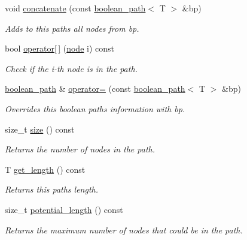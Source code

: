 \begin{DoxyCompactItemize}
void \hyperlink{classlgraph_1_1utils_1_1boolean__path_a005364eb88d63910a6e3965548d49197}{concatenate} (const \hyperlink{classlgraph_1_1utils_1_1boolean__path}{boolean\+\_\+path}$<$ T $>$ \&bp)
\begin{DoxyCompactList}\small\item\em Adds to this paths all nodes from bp. \end{DoxyCompactList}\item 
bool \hyperlink{classlgraph_1_1utils_1_1boolean__path_a9f0255a332cef8af3193fd683839d870}{operator\mbox{[}$\,$\mbox{]}} (\hyperlink{namespacelgraph_1_1utils_ab9c6b34241f0b68372c55f34c460e863}{node} i) const 
\begin{DoxyCompactList}\small\item\em Check if the i-\/th node is in the path. \end{DoxyCompactList}\item 
\hyperlink{classlgraph_1_1utils_1_1boolean__path}{boolean\+\_\+path} \& \hyperlink{classlgraph_1_1utils_1_1boolean__path_aedf4e03dbf45c2f66c79d01de5977ede}{operator=} (const \hyperlink{classlgraph_1_1utils_1_1boolean__path}{boolean\+\_\+path}$<$ T $>$ \&bp)
\begin{DoxyCompactList}\small\item\em Overrides this boolean path\textquotesingle{}s information with {\itshape bp}. \end{DoxyCompactList}\item 
size\+\_\+t \hyperlink{classlgraph_1_1utils_1_1boolean__path_a783ac5583112896796549774fd9e66c2}{size} () const 
\begin{DoxyCompactList}\small\item\em Returns the number of nodes in the path. \end{DoxyCompactList}\item 
T \hyperlink{classlgraph_1_1utils_1_1boolean__path_a2707b0a596ca58e412b41e70d07ae055}{get\+\_\+length} () const 
\begin{DoxyCompactList}\small\item\em Returns this path\textquotesingle{}s length. \end{DoxyCompactList}\item 
size\+\_\+t \hyperlink{classlgraph_1_1utils_1_1boolean__path_a572b365b3ab1232ca5d6f2fce4cd4519}{potential\+\_\+length} () const 
\begin{DoxyCompactList}\small\item\em Returns the maximum number of nodes that could be in the path. \end{DoxyCompactList}\item 

\end{DoxyCompactItemize}
